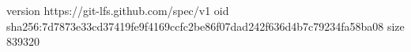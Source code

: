 version https://git-lfs.github.com/spec/v1
oid sha256:7d7873e33cd37419fe9f4169ccfc2be86f07dad242f636d4b7c79234fa58ba08
size 839320
